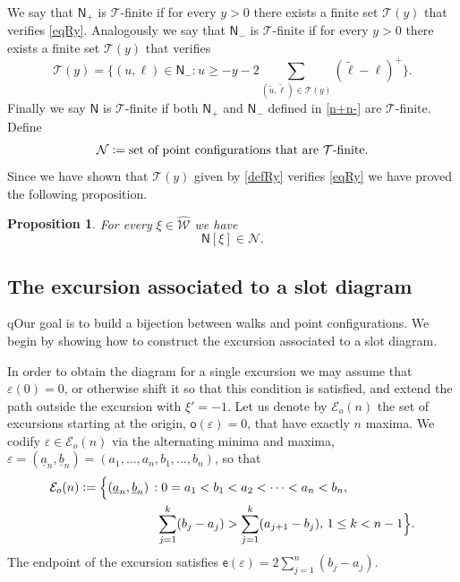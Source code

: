 \documentclass[12pt]{article}
\numberwithin{equation}{section}
\newtheorem{proposition}[theorem]{Proposition}
\newcommand{\cE}{\mathcal E}
\newcommand{\cN}{\mathcal N}
\newcommand{\cW}{\mathcal W}
\newcommand{\sN}{\mathsf{N}}
\newcommand{\se}{{\mathsf{e}}}
\newcommand{\so}{{\mathsf{o}}}
\newcommand{\hcW}{\widehat{\cW}}
\newcommand{\tu}{\tilde u}
\newcommand{\ua}{\underline a}
\newcommand{\ub}{\underline b}
\newcommand{\vep}{\varepsilon}
\newcommand{\eps}{\varepsilon}
\begin{document}
We say that $\sN_+$ is $\mathcal T$-finite if for every $y>0$ there exists a finite set $\mathcal T(y)$ that verifies \eqref{eqRy}.
Analogously we say that $\sN_-$ is $\mathcal T$-finite if for every $y>0$ there exists a finite set $\mathcal T(y)$ that verifies
\begin{equation*}
\mathcal T(y)= \{(u,\ell)\in \sN_-: u\geq -y-2\sum_{(\tu,\tilde \ell) \in \mathcal T(y)}(\tilde \ell-\ell)^+\}.
\end{equation*}
Finally we say $\sN$ is $\mathcal T$-finite if both 
$\sN_+$ and $\sN_-$ defined in \eqref{n+n-} are $\mathcal T$-finite. Define
\begin{align}
  \label{7}
  \cN  \vcentcolon = \text{set of point configurations that are
$\mathcal T$-finite}.
\end{align}
Since we have shown that $\mathcal T(y)$ given by \eqref{defRy} verifies \eqref{eqRy} we have proved the following proposition.

\begin{proposition}
For every $\xi\in\hcW$ we have
\[
\sN[\xi]\in \cN.
\]
\end{proposition}




\subsection{The excursion associated to a slot diagram}
\label{sde2}


qOur goal is to build a bijection between walks and point configurations. 
We begin by showing how to construct the excursion associated to a slot diagram. 

In order to obtain the diagram for a single excursion we may assume that $\eps(0)=0$, or otherwise shift it so that this condition is satisfied, and extend the path outside the excursion with $\xi'=-1$. Let us denote by $\cE_o(n)$ the set of excursions starting at the origin, $\so(\vep)=0$, that have exactly $n$ maxima. We codify $\vep\in\cE_o(n)$ via the alternating minima and maxima, $\vep=(\ua_n, \ub_{n})=(a_1,\dots, a_n, b_1,\dots, b_n)$, so that
\begin{align}\label{Rdef}
  \cE_o(n)&\vcentcolon =\Bigl\{(\ua_n, \ub_n)\,: 0=a_1<b_1<a_2<\dots<a_n<b_n,\\
  &\qquad\qquad\qquad\,\sum_{j=1}^k(b_j-a_{j})> \sum_{j=1}^k(a_{j+1}-b_{j}),\, 1\le k<n-1\Bigr\}. \notag
\end{align}
The endpoint of the excursion satisfies $ \se(\vep)=2\sum_{j=1}^n(b_j-a_{j})$.
\end{document}
